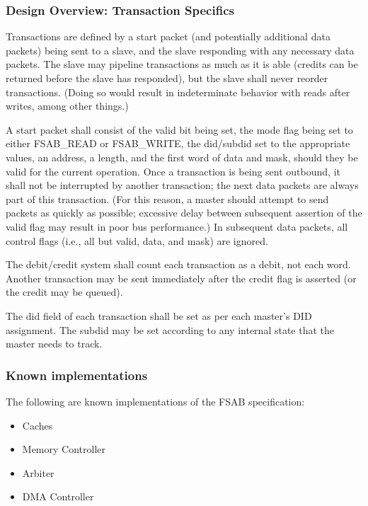 \documentclass[10pt,twocolumn]{article}
\begin{document}
\subsubsection{Design Overview: Transaction Specifics}

Transactions are defined by a start packet (and potentially additional data
packets) being sent to a slave, and the slave responding with any necessary
data packets. The slave may pipeline transactions as much as it is able
(credits can be returned before the slave has responded), but the slave
shall never reorder transactions. (Doing so would result in indeterminate
behavior with reads after writes, among other things.)

A start packet shall consist of the valid bit being set, the mode flag being
set to either FSAB\_READ or FSAB\_WRITE, the did/subdid set to the appropriate
values, an address, a length, and the first word of data and mask, should
they be valid for the current operation. Once a transaction is being sent
outbound, it shall not be interrupted by another transaction; the next data
packets are always part of this transaction. (For this reason, a master
should attempt to send packets as quickly as possible; excessive delay
between subsequent assertion of the valid flag may result in poor bus
performance.) In subsequent data packets, all control flags (i.e., all but
valid, data, and mask) are ignored.

The debit/credit system shall count each transaction as a debit, not each
word. Another transaction may be sent immediately after the credit flag is
asserted (or the credit may be queued).

The did field of each transaction shall be set as per each master's DID
assignment. The subdid may be set according to any internal state that the
master needs to track.


\subsubsection{Known implementations}

The following are known implementations of the FSAB specification:

\begin{itemize}
\item{Caches}
\item{Memory Controller}
\item{Arbiter}
\item{DMA Controller}
\end{itemize}
\end{document}
